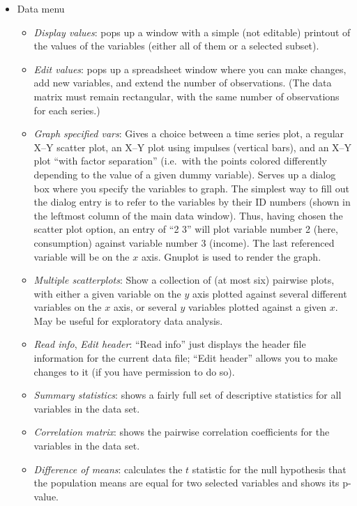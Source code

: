 \documentclass{article}
\begin{document}
\begin{itemize}
\item \textsf{Data menu} 
  \begin{itemize}
  \item \textit{Display values}: pops up a window with a simple (not
    editable) printout of the values of the variables (either all of
    them or a selected subset).
  \item \textit{Edit values}: pops up a spreadsheet window where you
    can make changes, add new variables, and extend the number of
    observations.  (The data matrix must remain rectangular, with the
    same number of observations for each series.)
  \item \textit{Graph specified vars}: Gives a choice between a time
    series plot, a regular X--Y scatter plot, an X--Y plot using
    impulses (vertical bars), and an X--Y plot ``with factor
    separation'' (i.e.\ with the points colored differently depending
    to the value of a given dummy variable).  Serves up a dialog box
    where you specify the variables to graph.  The simplest way to
    fill out the dialog entry is to refer to the variables by their ID
    numbers (shown in the leftmost column of the main data window).
    Thus, having chosen the scatter plot option, an entry of ``2 3''
    will plot variable number 2 (here, consumption) against variable
    number 3 (income).  The last referenced variable will be on the
    $x$ axis.  Gnuplot is used to render the graph.
  \item \textit{Multiple scatterplots}: Show a collection of (at most
    six) pairwise plots, with either a given variable on the $y$ axis
    plotted against several different variables on the $x$ axis, or
    several $y$ variables plotted against a given $x$.  May be useful
    for exploratory data analysis.
  \item \textit{Read info}, \textit{Edit header}: ``Read info'' just
    displays the header file information for the current data file;
    ``Edit header'' allows you to make changes to it (if you have
    permission to do so).
  \item \textit{Summary statistics}: shows a fairly full set of
    descriptive statistics for all variables in the data set.
  \item \textit{Correlation matrix}: shows the pairwise correlation
    coefficients for the variables in the data set.
  \item \textit{Difference of means}: calculates the $t$ statistic for
    the null hypothesis that the population means are equal for two
    selected variables and shows its p-value.

\end{itemize}
\end{itemize}
\end{document}
